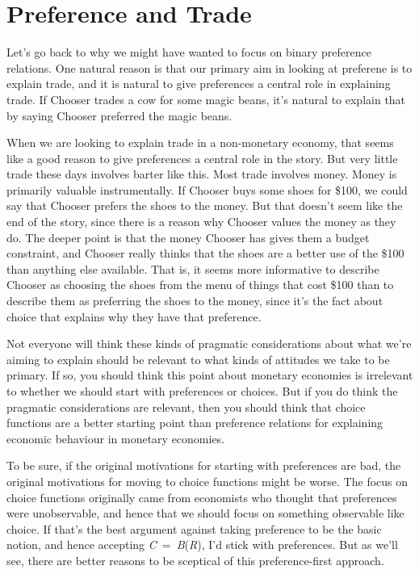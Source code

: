 \documentclass[
  11pt,
  letterpaper,
  DIV=11,
  numbers=noendperiod,
  twoside]{scrartcl}
\begin{document}
\section{Preference and Trade}\label{sec-trade}

Let's go back to why we might have wanted to focus on binary preference
relations. One natural reason is that our primary aim in looking at
preferene is to explain trade, and it is natural to give preferences a
central role in explaining trade. If Chooser trades a cow for some magic
beans, it's natural to explain that by saying Chooser preferred the
magic beans.

When we are looking to explain trade in a non-monetary economy, that
seems like a good reason to give preferences a central role in the
story. But very little trade these days involves barter like this. Most
trade involves money. Money is primarily valuable instrumentally. If
Chooser buys some shoes for \$100, we could say that Chooser prefers the
shoes to the money. But that doesn't seem like the end of the story,
since there is a reason why Chooser values the money as they do. The
deeper point is that the money Chooser has gives them a budget
constraint, and Chooser really thinks that the shoes are a better use of
the \$100 than anything else available. That is, it seems more
informative to describe Chooser as choosing the shoes from the menu of
things that cost \$100 than to describe them as preferring the shoes to
the money, since it's the fact about choice that explains why they have
that preference.

Not everyone will think these kinds of pragmatic considerations about
what we're aiming to explain should be relevant to what kinds of
attitudes we take to be primary. If so, you should think this point
about monetary economies is irrelevant to whether we should start with
preferences or choices. But if you do think the pragmatic considerations
are relevant, then you should think that choice functions are a better
starting point than preference relations for explaining economic
behaviour in monetary economies.

To be sure, if the original motivations for starting with preferences
are bad, the original motivations for moving to choice functions might
be worse. The focus on choice functions originally came from economists
who thought that preferences were unobservable, and hence that we should
focus on something observable like choice. If that's the best argument
against taking preference to be the basic notion, and hence accepting
\emph{C}~=~\emph{B}(\emph{R}), I'd stick with preferences. But as we'll
see, there are better reasons to be sceptical of this preference-first
approach.
\end{document}
